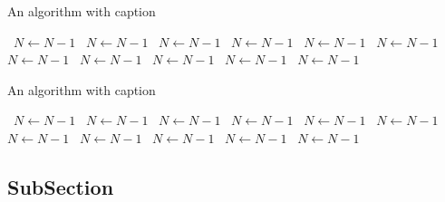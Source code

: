 \documentclass[a4paper]{article}
\begin{document}
\begin{algorithm}
\caption{An algorithm with caption}
\begin{algorithmic}
\    \State $N \gets N - 1$
\    \State $N \gets N - 1$
\    \State $N \gets N - 1$
\    \State $N \gets N - 1$
\    \State $N \gets N - 1$
\    \State $N \gets N - 1$
\    \State $N \gets N - 1$
\    \State $N \gets N - 1$
\    \State $N \gets N - 1$
\    \State $N \gets N - 1$
\    \State $N \gets N - 1$
\EndWhile
\end{algorithmic}
\end{algorithm}

\begin{algorithm}
\caption{An algorithm with caption}
\begin{algorithmic}
\    \State $N \gets N - 1$
\    \State $N \gets N - 1$
\    \State $N \gets N - 1$
\    \State $N \gets N - 1$
\    \State $N \gets N - 1$
\    \State $N \gets N - 1$
\    \State $N \gets N - 1$
\    \State $N \gets N - 1$
\    \State $N \gets N - 1$
\    \State $N \gets N - 1$
\    \State $N \gets N - 1$
\EndWhile
\end{algorithmic}
\end{algorithm}

\subsection{SubSection}
\end{document}
